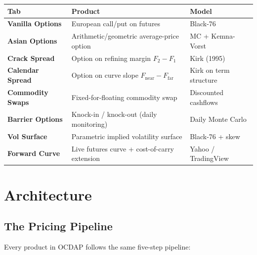 \documentclass[11pt,a4paper]{article}
\renewcommand{\arraystretch}{1}
\renewcommand{\arraystretch}{1}
\renewcommand{\arraystretch}{1.45}
\begin{document}
\medskip
\begin{center}
\renewcommand{\arraystretch}{1.5}
\begin{tabularx}{\textwidth}{>{\bfseries}l X l}
\toprule
Tab & Product & Model \\
\midrule
Vanilla Options   & European call/put on futures                              & Black-76 \\
Asian Options     & Arithmetic/geometric average-price option                 & MC + Kemna-Vorst \\
Crack Spread      & Option on refining margin $F_2-F_1$                       & Kirk (1995) \\
Calendar Spread   & Option on curve slope $F_\text{near}-F_\text{far}$        & Kirk on term structure \\
Commodity Swaps   & Fixed-for-floating commodity swap                         & Discounted cashflows \\
Barrier Options   & Knock-in / knock-out (daily monitoring)                   & Daily Monte Carlo \\
Vol Surface       & Parametric implied volatility surface                     & Black-76 + skew \\
Forward Curve     & Live futures curve + cost-of-carry extension              & Yahoo / TradingView \\
\bottomrule
\end{tabularx}
\end{center}

\section{Architecture}

\subsection{The Pricing Pipeline}

Every product in OCDAP follows the same five-step pipeline:
\end{document}
